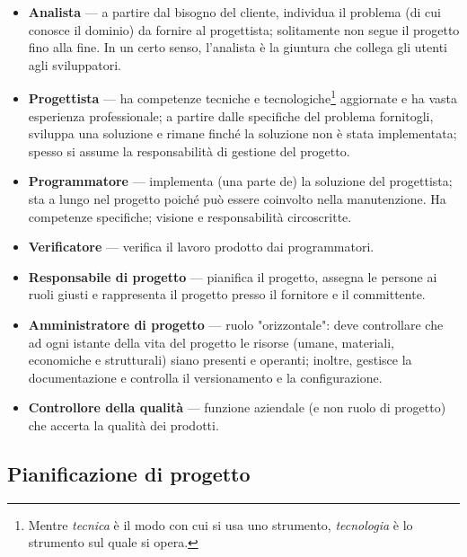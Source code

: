 \documentclass[a4paper]{article}
\begin{document}
	\begin{itemize}
		
			
	\item \textbf{Analista} --- a partire dal bisogno del cliente, individua il problema (di cui conosce il dominio) da fornire al progettista; solitamente non segue il progetto fino alla fine. In un certo senso, l'analista è la giuntura che collega gli utenti agli sviluppatori.
			
	\item \textbf{Progettista} --- ha competenze tecniche e tecnologiche\footnote{Mentre \emph{tecnica} è il modo con cui si usa uno strumento, \emph{tecnologia} è lo strumento sul quale si opera.} aggiornate e ha vasta esperienza professionale; a partire dalle specifiche del problema fornitogli, sviluppa una soluzione e rimane finché la soluzione non è stata implementata; spesso si assume la responsabilità di gestione del progetto.
			
	\item \textbf{Programmatore} --- implementa (una parte de) la soluzione del progettista; sta a lungo nel progetto poiché può essere coinvolto nella manutenzione. Ha competenze specifiche; visione e responsabilità circoscritte.
			
	\item \textbf{Verificatore} --- verifica il lavoro prodotto dai programmatori.
			
	\item \textbf{Responsabile di progetto} --- pianifica il progetto, assegna le persone ai ruoli giusti e rappresenta il progetto presso il fornitore e il committente.
			
	\item \textbf{Amministratore di progetto} --- ruolo "orizzontale": deve controllare che ad ogni istante della vita del progetto le risorse (umane, materiali, economiche e strutturali) siano presenti e operanti; inoltre, gestisce la documentazione e controlla il versionamento e la configurazione.
			
	\item \textbf{Controllore della qualità} --- funzione aziendale (e non ruolo di progetto) che accerta la qualità dei prodotti.
		
	\end{itemize}


		
	\subsection{Pianificazione di progetto}
\end{document}
